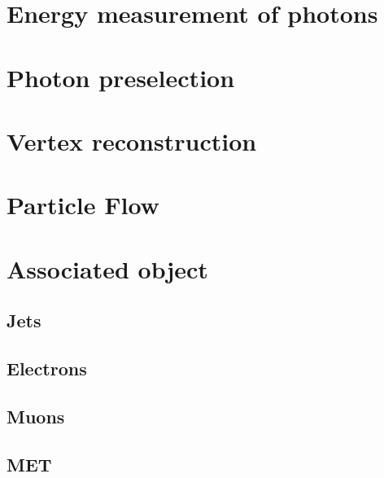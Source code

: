 \section{Energy measurement of photons}
\label{sec:photon_energy}

\section{Photon preselection}
\label{sec:photon_presel}

\section{Vertex reconstruction}
\label{sec:vtx_reco}


\section{Particle Flow}

\section{Associated object}
\subsection{Jets}
\subsection{Electrons}
\subsection{Muons}
\subsection{MET}

